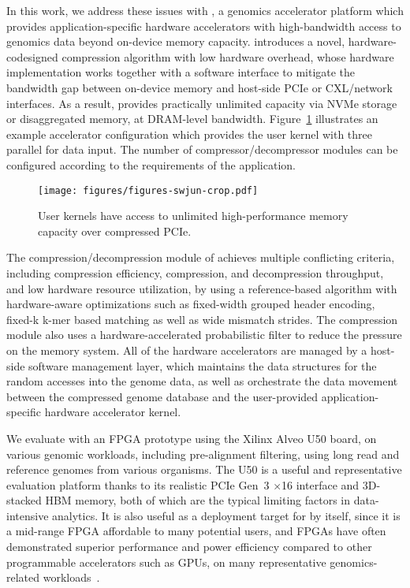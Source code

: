 In this work, we address these issues with \textbf{\name{}}, a genomics accelerator platform which provides application-specific hardware accelerators with high-bandwidth access to genomics data beyond on-device memory capacity.
\name{} introduces a novel, hardware-codesigned compression algorithm with low hardware overhead, whose hardware implementation works together with a software interface to mitigate the bandwidth gap between on-device memory and host-side PCIe or CXL/network interfaces.
As a result, \name{} provides practically unlimited capacity via NVMe storage or disaggregated memory, at DRAM-level bandwidth.
Figure~\ref{fig:overall} illustrates an example accelerator configuration which provides the user kernel with three parallel for data input.
The number of compressor/decompressor modules can be configured according to the requirements of the application.

\begin{figure}[htb]
    \centering
    \texttt{[image: figures/figures-swjun-crop.pdf]}
    \caption{User kernels have access to unlimited high-performance memory capacity over compressed PCIe.}
    \label{fig:overall}
\end{figure}

The compression/decompression module of \name{} achieves multiple conflicting criteria, including compression efficiency, compression, and decompression throughput, and low hardware resource utilization, by using a reference-based algorithm with hardware-aware optimizations such as fixed-width grouped header encoding, fixed-k k-mer based matching as well as wide mismatch strides.
The compression module also uses a hardware-accelerated probabilistic filter to reduce the pressure on the memory system.
All of the hardware accelerators are managed by a host-side software management layer, which maintains the data structures for the random accesses into the genome data, as well as orchestrate the data movement between the compressed genome database and the user-provided application-specific hardware accelerator kernel.

We evaluate \name{} with an FPGA prototype using the Xilinx Alveo U50 board, on various genomic workloads, including pre-alignment filtering, using long read and reference genomes from various organisms.
The U50 is a useful and representative evaluation platform thanks to its realistic PCIe Gen~3 $\times$16 interface and 3D-stacked HBM memory, both of which are the typical limiting factors in data-intensive analytics.
It is also useful as a deployment target for \name{} by itself, since it is a mid-range FPGA affordable to many potential users, and FPGAs have often demonstrated superior performance and power efficiency compared to other programmable accelerators such as GPUs, on many representative genomics-related workloads~\cite{chen2016spark,fei2018fpgasw,rucci2018swifold,wu2019fpga,fujiki2020seedex}.

